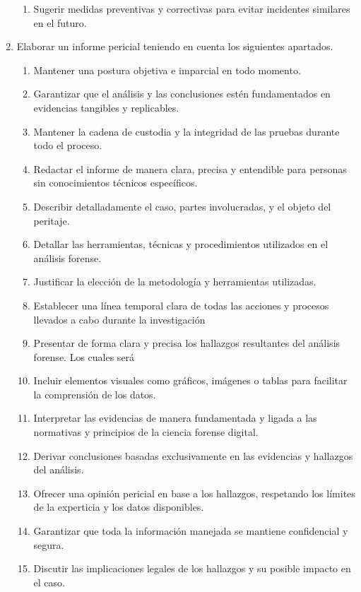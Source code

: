 \begin{enumerate}
\begin{enumerate}
        \item Sugerir medidas preventivas y correctivas para evitar incidentes similares en el futuro. 
    \end{enumerate}
    \item Elaborar un informe pericial teniendo en cuenta los siguientes apartados.
    \begin{enumerate}
        \item Mantener una postura objetiva e imparcial en todo momento.
        \item Garantizar que el análisis y las conclusiones estén fundamentados en evidencias tangibles y replicables.
        \item Mantener la cadena de custodia y la integridad de las pruebas durante todo el proceso.
        \item Redactar el informe de manera clara, precisa y entendible para personas sin conocimientos técnicos específicos.
        \item Describir detalladamente el caso, partes involucradas, y el objeto del peritaje.
        \item Detallar las herramientas, técnicas y procedimientos utilizados en el análisis forense.
        \item Justificar la elección de la metodología y herramientas utilizadas.
        \item Establecer una línea temporal clara de todas las acciones y procesos llevados a cabo durante la investigación
        \item Presentar de forma clara y precisa los hallazgos resultantes del análisis forense. Los cuales será
        \item Incluir elementos visuales como gráficos, imágenes o tablas para facilitar la comprensión de los datos.
        \item Interpretar las evidencias de manera fundamentada y ligada a las normativas y principios de la ciencia forense digital.
        \item Derivar conclusiones basadas exclusivamente en las evidencias y hallazgos del análisis.
        \item Ofrecer una opinión pericial en base a los hallazgos, respetando los límites de la experticia y los datos disponibles.
        \item Garantizar que toda la información manejada se mantiene confidencial y segura.
        \item Discutir las implicaciones legales de los hallazgos y su posible impacto en el caso.

\end{enumerate}
\end{enumerate}
